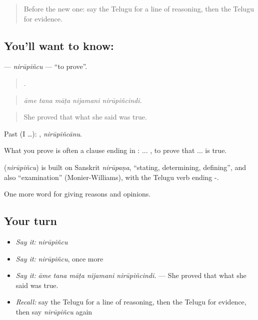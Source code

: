 \label{lesson:TE-C383-nirupincu}



\begin{quote}
Before the new one: say the Telugu for a line of reasoning, then the Telugu for evidence.
\end{quote}

\subsection*{You'll want to know: }
\textbf{} — \emph{nirūpiñcu} — \textquotedblleft{}to prove\textquotedblright{}.

\begin{quote}
    .
\end{quote}

\begin{quote}
\emph{āme tana māṭa nijamani nirūpiñcindi.}
\end{quote}

\begin{quote}
She proved that what she said was true.
\end{quote}

Past (I …): , \emph{nirūpiñcānu}.

What you prove is often a clause ending in : ...  , to prove that ... is true.

\begin{cousinweb}
\textbf{} (\emph{nirūpiñcu}) is built on Sanskrit \emph{nirūpaṇa}, \textquotedblleft{}stating, determining, defining\textquotedblright{}, and also \textquotedblleft{}examination\textquotedblright{} (Monier-Williams), with the Telugu verb ending -.
\end{cousinweb}

\begin{grammarlens}[title={What you've built}]
One more word for giving reasons and opinions.
\end{grammarlens}

\subsection*{Your turn}
\begin{itemize}
\raggedright
  \item \emph{Say it:} \emph{nirūpiñcu}
  \item \emph{Say it:} \emph{nirūpiñcu}, once more
  \item \emph{Say it:} \emph{āme tana māṭa nijamani nirūpiñcindi.} — She proved that what she said was true.
  \item \emph{Recall:} say the Telugu for a line of reasoning, then the Telugu for evidence, then say \emph{nirūpiñcu} again
\end{itemize}

